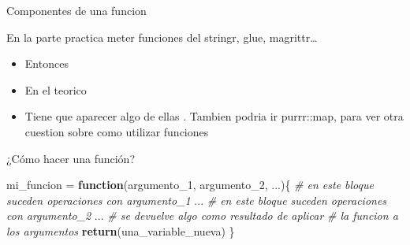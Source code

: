 \documentclass[ignorenonframetext,]{beamer}
\newenvironment{Shaded}{\begin{snugshade}}{\end{snugshade}}
\newcommand{\CommentTok}[1]{\textcolor[rgb]{0.56,0.35,0.01}{\textit{#1}}}
\newcommand{\ControlFlowTok}[1]{\textcolor[rgb]{0.13,0.29,0.53}{\textbf{#1}}}
\newcommand{\DecValTok}[1]{\textcolor[rgb]{0.00,0.00,0.81}{#1}}
\newcommand{\KeywordTok}[1]{\textcolor[rgb]{0.13,0.29,0.53}{\textbf{#1}}}
\newcommand{\NormalTok}[1]{#1}
\newcommand{\StringTok}[1]{\textcolor[rgb]{0.31,0.60,0.02}{#1}}
\providecommand{\tightlist}{%
  \setlength{\itemsep}{0pt}\setlength{\parskip}{0pt}}
\begin{document}
\begin{frame}{Componentes de una funcion}
\protect\hypertarget{componentes-de-una-funcion}{}

\end{frame}

\begin{frame}{En la parte practica meter funciones del stringr, glue,
magrittr\ldots{}}
\protect\hypertarget{en-la-parte-practica-meter-funciones-del-stringr-glue-magrittr}{}

\begin{itemize}
\tightlist
\item
  Entonces
\item
  En el teorico
\item
  Tiene que aparecer algo de ellas . Tambien podria ir purrr::map, para
  ver otra cuestion sobre como utilizar funciones
\end{itemize}

\end{frame}

\begin{frame}[fragile]{¿Cómo hacer una función?}
\protect\hypertarget{cuxf3mo-hacer-una-funciuxf3n}{}

\begin{Shaded}
\begin{Highlighting}[]
\NormalTok{mi_funcion =}\StringTok{ }\ControlFlowTok{function}\NormalTok{(argumento_}\DecValTok{1}\NormalTok{, argumento_}\DecValTok{2}\NormalTok{, ...)\{}
  \CommentTok{# en este bloque suceden operaciones con argumento_1}
\NormalTok{  ...}
  \CommentTok{# en este bloque suceden operaciones con argumento_2}
\NormalTok{  ...}
  \CommentTok{# se devuelve algo como resultado de aplicar}
  \CommentTok{# la funcion a los argumentos}
  \KeywordTok{return}\NormalTok{(una_variable_nueva)}
\NormalTok{\}}
\end{Highlighting}
\end{Shaded}

\end{frame}
\end{document}
